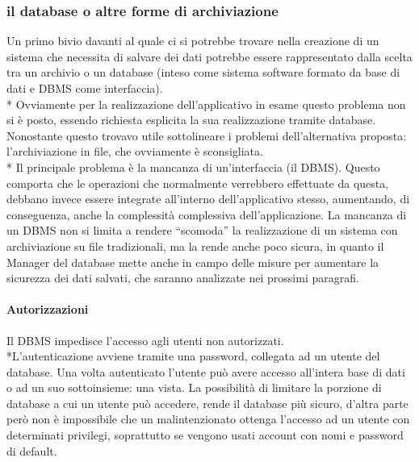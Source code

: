 \documentclass[12pt]{article}
\begin{document}
\subsubsection{il database o altre forme di archiviazione}
Un primo bivio davanti al quale ci si potrebbe trovare nella creazione di un sistema che necessita di salvare dei dati potrebbe essere rappresentato dalla scelta tra un archivio o un database (inteso come sistema software formato da base di dati e DBMS come interfaccia).\\*
Ovviamente per la realizzazione dell’applicativo in esame questo problema non si è posto, essendo richiesta esplicita la sua realizzazione tramite database. Nonostante questo trovavo utile sottolineare i problemi dell’alternativa proposta: l'archiviazione in file, che ovviamente è sconsigliata.\\*
Il principale problema è la mancanza di un’interfaccia (il DBMS). Questo comporta che le operazioni che normalmente verrebbero effettuate da questa, debbano invece essere integrate all’interno dell’applicativo stesso, aumentando, di conseguenza, anche la complessità complessiva dell’applicazione.
La mancanza di un DBMS non si limita a rendere “scomoda” la realizzazione di un sistema con archiviazione su file tradizionali, ma la rende anche poco sicura, in quanto il Manager del database mette anche in campo delle misure per aumentare la sicurezza dei dati salvati, che saranno analizzate nei prossimi paragrafi.

\bigskip
\paragraph{Autorizzazioni}Il DBMS impedisce l’accesso agli utenti non autorizzati.
\\*L’autenticazione avviene tramite una password, collegata ad un utente del database.
Una volta autenticato l’utente può avere accesso all’intera base di dati o ad un suo sottoinsieme: una vista. 
La possibilità di limitare la porzione di database a cui un utente può accedere, rende il database più sicuro, d’altra parte però non è impossibile che un malintenzionato ottenga l’accesso ad un utente con determinati privilegi, soprattutto se vengono usati account con nomi e password di default.

\bigskip
\end{document}
